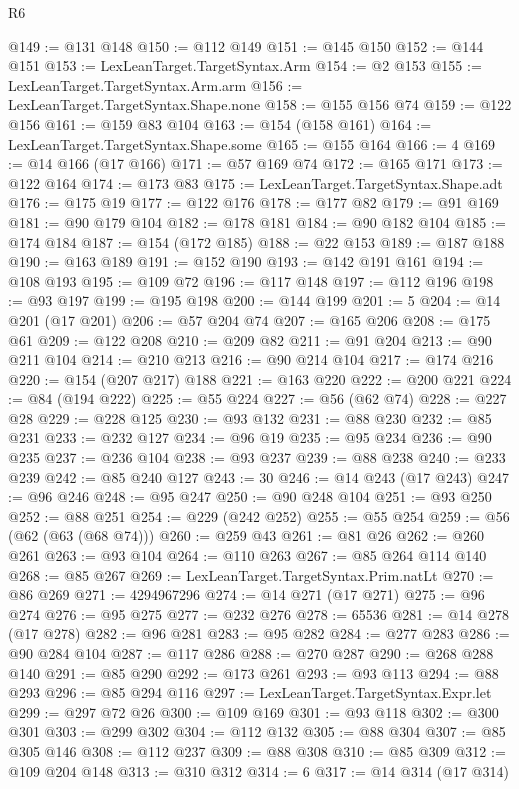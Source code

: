 \begin{lexlean}{R6}
\begin{coremodule}
@149 := @131 @148
@150 := @112 @149
@151 := @145 @150
@152 := @144 @151
@153 := LexLeanTarget.TargetSyntax.Arm
@154 := @2 @153
@155 := LexLeanTarget.TargetSyntax.Arm.arm
@156 := LexLeanTarget.TargetSyntax.Shape.none
@158 := @155 @156 @74
@159 := @122 @156
@161 := @159 @83 @104
@163 := @154 (@158 @161)
@164 := LexLeanTarget.TargetSyntax.Shape.some
@165 := @155 @164
@166 := 4
@169 := @14 @166 (@17 @166)
@171 := @57 @169 @74
@172 := @165 @171
@173 := @122 @164
@174 := @173 @83
@175 := LexLeanTarget.TargetSyntax.Shape.adt
@176 := @175 @19
@177 := @122 @176
@178 := @177 @82
@179 := @91 @169
@181 := @90 @179 @104
@182 := @178 @181
@184 := @90 @182 @104
@185 := @174 @184
@187 := @154 (@172 @185)
@188 := @22 @153
@189 := @187 @188
@190 := @163 @189
@191 := @152 @190
@193 := @142 @191 @161
@194 := @108 @193
@195 := @109 @72
@196 := @117 @148
@197 := @112 @196
@198 := @93 @197
@199 := @195 @198
@200 := @144 @199
@201 := 5
@204 := @14 @201 (@17 @201)
@206 := @57 @204 @74
@207 := @165 @206
@208 := @175 @61
@209 := @122 @208
@210 := @209 @82
@211 := @91 @204
@213 := @90 @211 @104
@214 := @210 @213
@216 := @90 @214 @104
@217 := @174 @216
@220 := @154 (@207 @217) @188
@221 := @163 @220
@222 := @200 @221
@224 := @84 (@194 @222)
@225 := @55 @224
@227 := @56 (@62 @74)
@228 := @227 @28
@229 := @228 @125
@230 := @93 @132
@231 := @88 @230
@232 := @85 @231
@233 := @232 @127
@234 := @96 @19
@235 := @95 @234
@236 := @90 @235
@237 := @236 @104
@238 := @93 @237
@239 := @88 @238
@240 := @233 @239
@242 := @85 @240 @127
@243 := 30
@246 := @14 @243 (@17 @243)
@247 := @96 @246
@248 := @95 @247
@250 := @90 @248 @104
@251 := @93 @250
@252 := @88 @251
@254 := @229 (@242 @252)
@255 := @55 @254
@259 := @56 (@62 (@63 (@68 @74)))
@260 := @259 @43
@261 := @81 @26
@262 := @260 @261
@263 := @93 @104
@264 := @110 @263
@267 := @85 @264 @114 @140
@268 := @85 @267
@269 := LexLeanTarget.TargetSyntax.Prim.natLt
@270 := @86 @269
@271 := 4294967296
@274 := @14 @271 (@17 @271)
@275 := @96 @274
@276 := @95 @275
@277 := @232 @276
@278 := 65536
@281 := @14 @278 (@17 @278)
@282 := @96 @281
@283 := @95 @282
@284 := @277 @283
@286 := @90 @284 @104
@287 := @117 @286
@288 := @270 @287
@290 := @268 @288 @140
@291 := @85 @290
@292 := @173 @261
@293 := @93 @113
@294 := @88 @293
@296 := @85 @294 @116
@297 := LexLeanTarget.TargetSyntax.Expr.let
@299 := @297 @72 @26
@300 := @109 @169
@301 := @93 @118
@302 := @300 @301
@303 := @299 @302
@304 := @112 @132
@305 := @88 @304
@307 := @85 @305 @146
@308 := @112 @237
@309 := @88 @308
@310 := @85 @309
@312 := @109 @204 @148
@313 := @310 @312
@314 := 6
@317 := @14 @314 (@17 @314)

\end{coremodule}
\end{lexlean}
